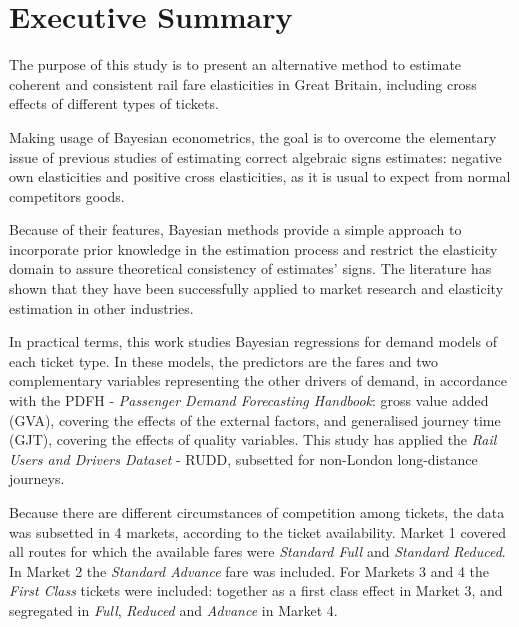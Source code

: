 \chapter*{Executive Summary}



The purpose of this study is to present an alternative method to estimate coherent and consistent rail fare elasticities in Great Britain, including cross effects of different types of tickets.

Making usage of Bayesian econometrics, the goal is to overcome the elementary issue of previous studies of estimating correct algebraic signs estimates: negative own elasticities and positive cross elasticities, as it is usual to expect from normal competitors goods. 

Because of their features, Bayesian methods provide a simple approach to incorporate prior knowledge in the estimation process and restrict the elasticity domain to assure theoretical consistency of estimates' signs. The literature has shown that they have been successfully applied to market research and elasticity estimation in other industries. 

In practical terms, this work studies Bayesian regressions for demand models of each ticket type. In these models, the predictors are the fares and two complementary variables representing the other drivers of demand, in accordance with the PDFH - \textit{Passenger Demand Forecasting Handbook}: gross value added (GVA), covering the effects of the external factors, and generalised journey time (GJT), covering the effects of quality variables. This study has applied the \textit{Rail Users and Drivers Dataset} - RUDD, subsetted for non-London long-distance journeys.

Because there are different circumstances of competition among tickets, the data was subsetted in 4 markets, according to the ticket availability. Market 1 covered all routes for which the available fares were \textit{Standard Full} and \textit{Standard Reduced}. In Market 2 the \textit{Standard Advance} fare was included. For Markets 3 and 4 the \textit{First Class} tickets were included: together as a first class effect in Market 3, and segregated in \textit{Full}, \textit{Reduced} and \textit{Advance} in Market 4. 

